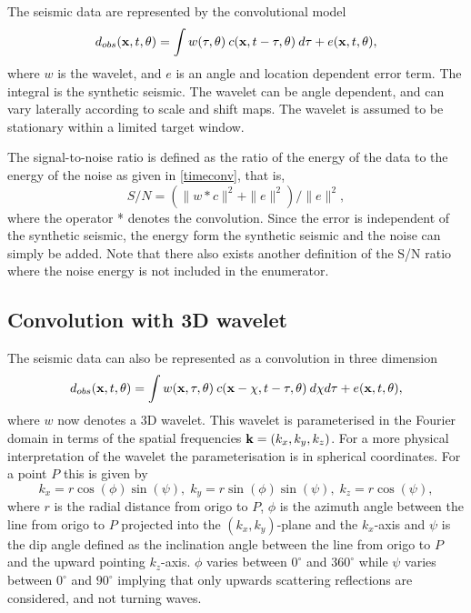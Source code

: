 The seismic data are represented by the convolutional model
%
\begin{equation} \label{timeconv}
   d_{obs}(\mathbf{x},t,\theta)
    =\int w(\tau,\theta) \: c(\mathbf{x},t-\tau,\theta) \: d\tau + e(\mathbf{x},t,\theta),
\end{equation}
%
where $w$ is the wavelet, and $e$ is an angle and location dependent
error term. The integral is the synthetic seismic. The wavelet can be
angle dependent, and can vary laterally according to scale and shift
maps. The wavelet is assumed to be stationary within a limited 
target window. 

The signal-to-noise ratio is defined as the ratio of the energy of the
data to the energy of the noise as given in \autoref{timeconv}, that is, 
%
\begin{equation} \label{SNR}
   S/N =  \left(\| w * c\|^2+\| e\|^2\right) / \| e\|^2,
\end{equation}
%
\noindent
where the operator * denotes the convolution. Since the error is
independent of the synthetic seismic, the energy form the synthetic
seismic and the noise can simply be added. Note that there also exists
another definition of the S/N ratio where the noise energy is not
included in the enumerator.

\subsection{Convolution with 3D wavelet}
The seismic data can also be represented as a convolution in three dimension 
%
\begin{equation} \label{3Dconv}
   d_{obs}(\mathbf{x},t,\theta)
    =\int w(\mathbf{x},\tau,\theta) \: c(\mathbf{x}-\mathbf{\chi},t-\tau,\theta) \: d\mathbf{\chi}d\tau + e(\mathbf{x},t,\theta),
\end{equation}
where $w$ now denotes a 3D wavelet. This wavelet is parameterised in
the Fourier domain in terms of the spatial frequencies $\mathbf{k}=(k_x,
k_y, k_z)$. For a more physical interpretation of the wavelet the
parameterisation is in spherical coordinates. For a point $P$ this is
given by 
\begin{equation}
k_x=r\cos(\phi)\sin(\psi),\; k_y=r\sin(\phi)\sin(\psi),\; k_z=r\cos(\psi), \label{eq:spherical}
\end{equation}
where $r$ is the radial distance from origo to $P$, $\phi$ is the
azimuth angle between the line from origo to $P$ projected into the
$(k_x,k_y)$-plane and the $k_x$-axis and $\psi$ is the dip angle
defined as the inclination angle between the line from origo to $P$
and the upward pointing $k_z$-axis. $\phi$ varies between $0^{\circ}$
and $360^{\circ}$ while $\psi$ varies between $0^{\circ}$ and
$90^{\circ}$ implying that only upwards scattering reflections are
considered, and not turning waves. 

